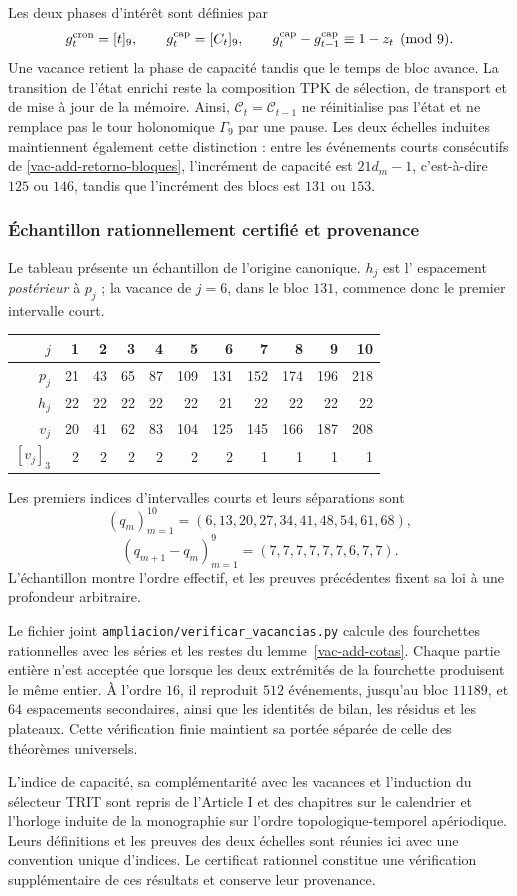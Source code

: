 Les deux phases d'intérêt sont définies par
\[
 g_t^{\rm cron}=[t]_9,
 \qquad g_t^{\rm cap}=[\mathcal C_t]_9,
 \qquad
 g_t^{\rm cap}-g_{t-1}^{\rm cap}\equiv1-z_t\pmod9.
\]
Une vacance retient la phase de capacité tandis que le temps de bloc
avance. La transition de l'état enrichi reste la composition
TPK de sélection, de transport et de mise à jour de la mémoire. Ainsi,
\(\mathcal C_t=\mathcal C_{t-1}\) ne réinitialise pas l'état et ne
remplace pas le tour holonomique \(\Gamma_9\) par une pause. Les
deux échelles induites maintiennent également cette distinction : entre les événements
courts consécutifs de \eqref{vac-add-retorno-bloques}, l'incrément de
capacité est \(21d_m-1\), c'est-à-dire \(125\) ou \(146\), tandis que
l'incrément des blocs est \(131\) ou \(153\).

\subsubsection{Échantillon rationnellement certifié et provenance}
\label{vac-add-muestra}

Le tableau présente un échantillon de l'origine canonique. \(h_j\) est l'
espacement \emph{postérieur} à \(p_j\) ; la vacance de
\(j=6\), dans le bloc \(131\), commence donc le premier intervalle court.
\begin{center}
\small
\begin{tabular}{r|rrrrrrrrrr}
\toprule
\(j\)&1&2&3&4&5&6&7&8&9&10\\
\midrule
\(p_j\)&21&43&65&87&109&131&152&174&196&218\\
\(h_j\)&22&22&22&22&22&21&22&22&22&22\\
\(v_j\)&20&41&62&83&104&125&145&166&187&208\\
\([v_j]_3\)&2&2&2&2&2&2&1&1&1&1\\
\bottomrule
\end{tabular}
\end{center}
Les premiers indices d'intervalles courts et leurs séparations sont
\[
 (q_m)_{m=1}^{10}=(6,13,20,27,34,41,48,54,61,68),
\]
\[
 (q_{m+1}-q_m)_{m=1}^{9}=(7,7,7,7,7,7,6,7,7).
\]
L'échantillon montre l'ordre effectif, et les preuves précédentes fixent sa loi à une profondeur arbitraire.

Le fichier joint \texttt{ampliacion/verificar\_vacancias.py} calcule
des fourchettes rationnelles avec les séries et les restes du
lemme~\ref{vac-add-cotas}. Chaque partie entière n'est acceptée que lorsque
les deux extrémités de la fourchette produisent le même entier. À l'ordre
\(16\), il reproduit \(512\) événements, jusqu'au bloc \(11189\), et
\(64\) espacements secondaires, ainsi que les identités de bilan,
les résidus et les plateaux. Cette vérification finie maintient sa portée
séparée de celle des théorèmes universels.

L'indice de capacité, sa complémentarité avec les vacances et l'induction du sélecteur TRIT sont repris de l'Article I et des chapitres sur le calendrier et l'horloge induite de la monographie sur l'ordre topologique-temporel apériodique. Leurs définitions et les preuves des deux échelles sont réunies ici avec une convention unique d'indices. Le certificat rationnel constitue une vérification supplémentaire de ces résultats et conserve leur provenance.
